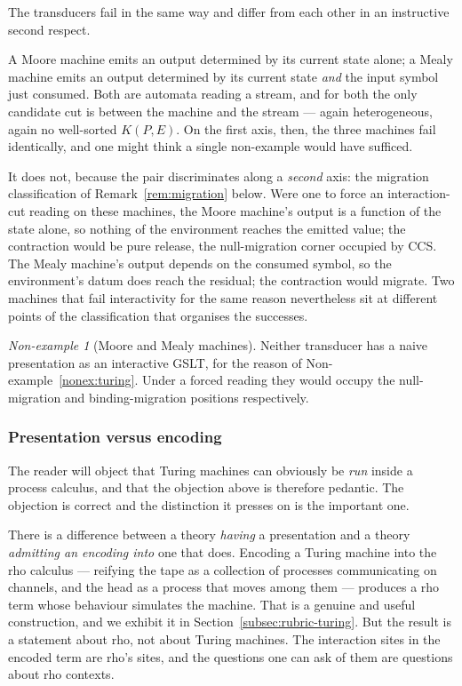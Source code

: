 \documentclass[11pt]{article}
\theoremstyle{definition}
\theoremstyle{plain}
\theoremstyle{remark}
\newtheorem{nonexample}[definition]{Non-example}
\begin{document}
The transducers fail in the same way and differ from each other in an instructive
second respect.

A Moore machine emits an output determined by its current state alone; a Mealy machine
emits an output determined by its current state \emph{and} the input symbol just
consumed. Both are automata reading a stream, and for both the only candidate cut is
between the machine and the stream --- again heterogeneous, again no well-sorted
$K(P,E)$. On the first axis, then, the three machines fail identically, and one might
think a single non-example would have sufficed.

It does not, because the pair discriminates along a \emph{second} axis: the migration
classification of Remark~\ref{rem:migration} below. Were one to force an interaction-cut
reading on these machines, the Moore machine's output is a function of the state alone,
so nothing of the environment reaches the emitted value; the contraction would be pure
release, the null-migration corner occupied by CCS. The Mealy machine's output depends
on the consumed symbol, so the environment's datum does reach the residual; the
contraction would migrate. Two machines that fail interactivity for the same reason
nevertheless sit at different points of the classification that organises the successes.

\begin{nonexample}[Moore and Mealy machines]
Neither transducer has a naive presentation as an interactive GSLT, for the reason of
Non-example~\ref{nonex:turing}. Under a forced reading they would occupy the
null-migration and binding-migration positions respectively.
\end{nonexample}

\subsubsection{Presentation versus encoding}

The reader will object that Turing machines can obviously be \emph{run} inside a process
calculus, and that the objection above is therefore pedantic. The objection is correct
and the distinction it presses on is the important one.

There is a difference between a theory \emph{having} a presentation and a theory
\emph{admitting an encoding into} one that does. Encoding a Turing machine into the rho
calculus --- reifying the tape as a collection of processes communicating on channels,
and the head as a process that moves among them --- produces a rho term whose behaviour
simulates the machine. That is a genuine and useful construction, and we exhibit it in
Section~\ref{subsec:rubric-turing}. But the result is a statement about rho, not about
Turing machines. The interaction sites in the encoded term are rho's sites, and the
questions one can ask of them are questions about rho contexts.
\end{document}
